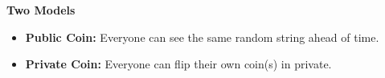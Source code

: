 \begin{center}\textbf{Two Models}\end{center}
\pause
\begin{itemize}
	\item \textbf{Public Coin:} Everyone can see the same random string ahead of time.
	\pause
	\item \textbf{Private Coin:} Everyone can flip their own coin(s) in private.
\end{itemize}
